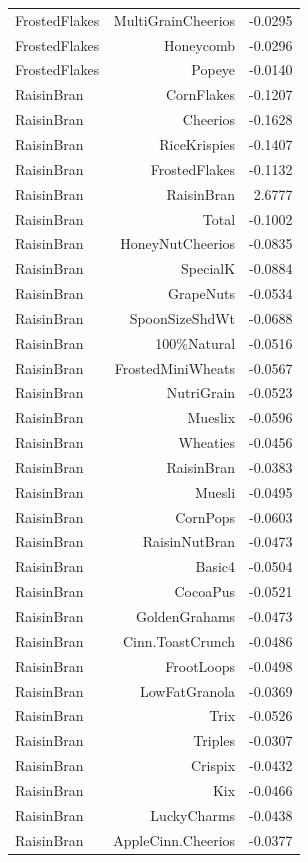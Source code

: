 \begin{longtable}{@{}lrr@{}}
FrostedFlakes & MultiGrainCheerios & -0.0295 \\
FrostedFlakes & Honeycomb & -0.0296 \\
FrostedFlakes & Popeye & -0.0140 \\
RaisinBran & CornFlakes & -0.1207 \\
RaisinBran & Cheerios & -0.1628 \\
RaisinBran & RiceKrispies & -0.1407 \\
RaisinBran & FrostedFlakes & -0.1132 \\
RaisinBran & RaisinBran & 2.6777 \\
RaisinBran & Total & -0.1002 \\
RaisinBran & HoneyNutCheerios & -0.0835 \\
RaisinBran & SpecialK & -0.0884 \\
RaisinBran & GrapeNuts & -0.0534 \\
RaisinBran & SpoonSizeShdWt & -0.0688 \\
RaisinBran & 100\%Natural & -0.0516 \\
RaisinBran & FrostedMiniWheats & -0.0567 \\
RaisinBran & NutriGrain & -0.0523 \\
RaisinBran & Mueslix & -0.0596 \\
RaisinBran & Wheaties & -0.0456 \\
RaisinBran & RaisinBran & -0.0383 \\
RaisinBran & Muesli & -0.0495 \\
RaisinBran & CornPops & -0.0603 \\
RaisinBran & RaisinNutBran & -0.0473 \\
RaisinBran & Basic4 & -0.0504 \\
RaisinBran & CocoaPus & -0.0521 \\
RaisinBran & GoldenGrahams & -0.0473 \\
RaisinBran & Cinn.ToastCrunch & -0.0486 \\
RaisinBran & FrootLoops & -0.0498 \\
RaisinBran & LowFatGranola & -0.0369 \\
RaisinBran & Trix & -0.0526 \\
RaisinBran & Triples & -0.0307 \\
RaisinBran & Crispix & -0.0432 \\
RaisinBran & Kix & -0.0466 \\
RaisinBran & LuckyCharms & -0.0438 \\
RaisinBran & AppleCinn.Cheerios & -0.0377 \\

\end{longtable}
